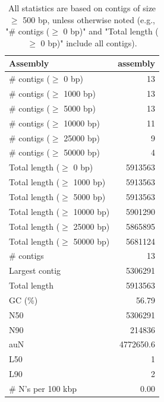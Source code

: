 \documentclass[12pt,a4paper]{article}
\begin{document}
\begin{table}[ht]
\begin{center}
\caption{All statistics are based on contigs of size $\geq$ 500 bp, unless otherwise noted (e.g., "\# contigs ($\geq$ 0 bp)" and "Total length ($\geq$ 0 bp)" include all contigs).}
\begin{tabular}{|l*{1}{|r}|}
\hline
Assembly & assembly \\ \hline
\# contigs ($\geq$ 0 bp) & 13 \\ \hline
\# contigs ($\geq$ 1000 bp) & 13 \\ \hline
\# contigs ($\geq$ 5000 bp) & 13 \\ \hline
\# contigs ($\geq$ 10000 bp) & 11 \\ \hline
\# contigs ($\geq$ 25000 bp) & 9 \\ \hline
\# contigs ($\geq$ 50000 bp) & 4 \\ \hline
Total length ($\geq$ 0 bp) & 5913563 \\ \hline
Total length ($\geq$ 1000 bp) & 5913563 \\ \hline
Total length ($\geq$ 5000 bp) & 5913563 \\ \hline
Total length ($\geq$ 10000 bp) & 5901290 \\ \hline
Total length ($\geq$ 25000 bp) & 5865895 \\ \hline
Total length ($\geq$ 50000 bp) & 5681124 \\ \hline
\# contigs & 13 \\ \hline
Largest contig & 5306291 \\ \hline
Total length & 5913563 \\ \hline
GC (\%) & 56.79 \\ \hline
N50 & 5306291 \\ \hline
N90 & 214836 \\ \hline
auN & 4772650.6 \\ \hline
L50 & 1 \\ \hline
L90 & 2 \\ \hline
\# N's per 100 kbp & 0.00 \\ \hline
\end{tabular}
\end{center}
\end{table}
\end{document}

